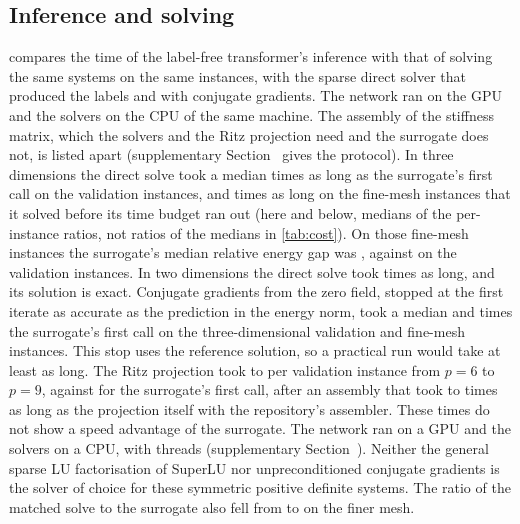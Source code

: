 \subsection{Inference and solving}\label{sec:cost:inference}



 compares the time of the label-free transformer's inference with that of
solving the same systems on the same instances, with the sparse direct solver that produced the labels and with conjugate gradients. The network ran on the GPU and the solvers on the CPU of the
same machine. The assembly of the stiffness matrix, which the solvers and the Ritz projection
need and the surrogate does not, is listed apart (supplementary Section~\SuppTiming{} gives
the protocol). In three dimensions the direct solve took
a median \numCostThreeValDirectRatio{} times as long as the surrogate's first call on the validation instances, and
\numCostThreeFineDirectRatio{} times as long on the \numCostFineDirectSolved{} fine-mesh
instances that it solved before its time budget ran out (here and below, medians of the
per-instance ratios, not ratios of the medians in \cref{tab:cost}). On those fine-mesh
instances the surrogate's median relative energy gap was \numCostThreeFineGap{}, against
\numCostThreeValGap{} on the validation instances. In two dimensions the direct solve took
\numCostTwoDirectRatio{} times as long, and its solution is exact. Conjugate gradients from
the zero field, stopped at the first iterate as accurate as the prediction in the energy
norm, took a median \numCostThreeValMatchRatio{} and \numCostThreeFineMatchRatio{} times the
surrogate's first call on the three-dimensional validation and fine-mesh instances. This stop uses the reference
solution, so a practical run would take at least as long. The Ritz
projection took \numCostRitzValMin{} to \numCostRitzValMax{} per validation instance from
$p=6$ to $p=9$, against \numCostSurrVal{} for the surrogate's first call, after an assembly
that took \numCostAsmOverRitzMin{} to \numCostAsmOverRitzMax{} times as long as the
projection itself with the repository's assembler. These times do not show a speed advantage of the surrogate. The network ran on a GPU and the
solvers on a CPU, with \numCostThreads{} threads (supplementary Section~\SuppTiming{}).
Neither the general sparse LU factorisation of SuperLU nor unpreconditioned conjugate
gradients is the solver of choice for these symmetric positive definite systems. The ratio of
the matched solve to the surrogate also fell from \numCostThreeValMatchRatio{} to
\numCostThreeFineMatchRatio{} on the finer mesh.

